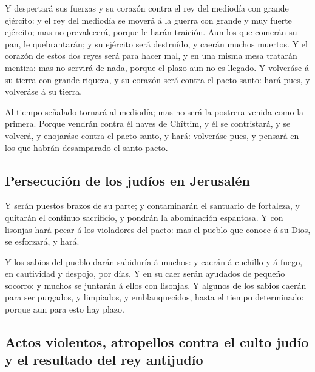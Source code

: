  Y despertará sus fuerzas y su corazón contra el rey del
mediodía con grande ejército: y el rey del mediodía se moverá á la
guerra con grande y muy fuerte ejército; mas no prevalecerá, porque le
harán traición.  Aun los que comerán su pan, le
quebrantarán; y su ejército será destruído, y caerán muchos muertos.
 Y el corazón de estos dos reyes será para hacer mal, y
en una misma mesa tratarán mentira: mas no servirá de nada, porque el
plazo aun no es llegado.  Y volveráse á su tierra con
grande riqueza, y su corazón será contra el pacto santo: hará pues, y
volveráse á su tierra.

 Al tiempo señalado tornará al mediodía; mas no será la
postrera venida como la primera.  Porque vendrán contra
él naves de Chîttim, y él se contristará, y se volverá, y enojaráse
contra el pacto santo, y hará: volveráse pues, y pensará en los que
habrán desamparado el santo pacto.

\hypertarget{persecuciuxf3n-de-los-juduxedos-en-jerusaluxe9n}{%
\subsection{Persecución de los judíos en
Jerusalén}\label{persecuciuxf3n-de-los-juduxedos-en-jerusaluxe9n}}

 Y serán puestos brazos de su parte; y contaminarán el
santuario de fortaleza, y quitarán el continuo sacrificio, y pondrán la
abominación espantosa.  Y con lisonjas hará pecar á los
violadores del pacto: mas el pueblo que conoce á su Dios, se esforzará,
y hará.

 Y los sabios del pueblo darán sabiduría á muchos: y
caerán á cuchillo y á fuego, en cautividad y despojo, por días.
 Y en su caer serán ayudados de pequeño socorro: y muchos
se juntarán á ellos con lisonjas.  Y algunos de los
sabios caerán para ser purgados, y limpiados, y emblanquecidos, hasta el
tiempo determinado: porque aun para esto hay plazo.

\hypertarget{actos-violentos-atropellos-contra-el-culto-juduxedo-y-el-resultado-del-rey-antijuduxedo}{%
\subsection{Actos violentos, atropellos contra el culto judío y el
resultado del rey
antijudío}\label{actos-violentos-atropellos-contra-el-culto-juduxedo-y-el-resultado-del-rey-antijuduxedo}}

